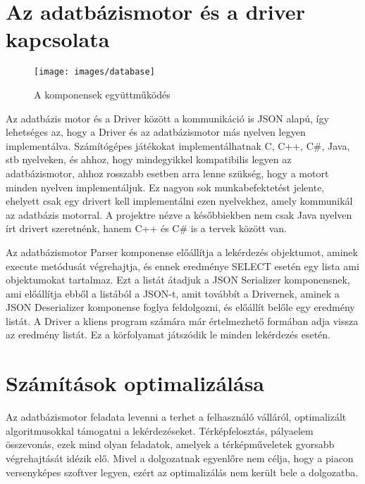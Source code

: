 \section{Az adatbázismotor és a driver kapcsolata}

\begin{figure}[htb]
	\begin{center}
		\texttt{[image: images/database]}
		\caption{A komponensek együttműködés}
		\label{fig:database}
	\end{center}
\end{figure}

Az adatbázis motor és a Driver között a kommunikáció is JSON alapú, így lehetséges az, hogy a Driver és az adatbázismotor más nyelven legyen implementálva. Számítógépes játékokat implementálhatnak C, C++, C\#, Java, stb nyelveken, és ahhoz, hogy mindegyikkel kompatibilis legyen az adatbázismotor, ahhoz rosszabb esetben arra lenne szükség, hogy a motort minden nyelven implementáljuk. Ez nagyon sok munkabefektetést jelente, ehelyett csak egy drivert kell implementálni ezen nyelvekhez, amely kommunikál az adatbázis motorral. A projektre nézve a későbbiekben nem csak Java nyelven írt drivert szeretnénk, hanem C++ és C\# is a tervek között van.

Az adatbázismotor Parser komponense előállítja a lekérdezés objektumot, aminek execute metódusát végrehajtja, és ennek eredménye SELECT esetén egy lista ami objektumokat tartalmaz. Ezt a listát átadjuk a JSON Serializer komponensnek, ami előállítja ebből a listából a JSON-t, amit továbbít a Drivernek, aminek a JSON Deserializer komponense foglya feldolgozni, és előállít belőle egy eredmény listát. A Driver a kliens program számára már értelmezhető formában adja vissza az eredmény listát. Ez a körfolyamat játszódik le minden lekérdezés esetén.

\section{Számítások optimalizálása}

Az adatbázismotor feladata levenni a terhet a felhasználó válláról, 
optimalizált algoritmusokkal támogatni a lekérdezéseket. Térképfelosztás, pályaelem összevonás, ezek mind olyan feladatok,
amelyek a térképműveletek gyorsabb végrehajtását idézik elő.
Mivel a dolgozatnak egyenlőre nem célja, hogy a piacon versenyképes szoftver legyen, ezért az optimalizálás nem került bele a dolgozatba.